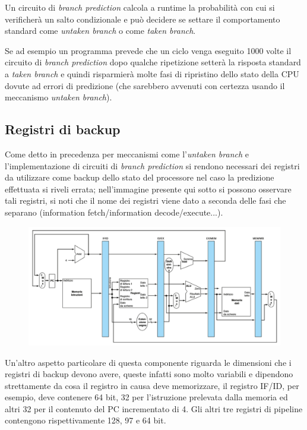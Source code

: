 \documentclass[class=book, crop=false, oneside]{standalone}
\begin{document}
Un circuito di \emph{branch prediction} calcola a runtime la probabilità con cui si verificherà un salto condizionale e può decidere se settare il comportamento standard come \emph{untaken branch} o come \emph{taken branch}.

Se ad esempio un programma prevede che un ciclo venga eseguito 1000 volte il circuito di \emph{branch prediction} dopo qualche ripetizione setterà la risposta standard a \emph{taken branch} e quindi risparmierà molte fasi di ripristino dello stato della CPU dovute ad errori di predizione (che sarebbero avvenuti con certezza usando il meccanismo \emph{untaken branch}).

\subsection{Registri di backup}
Come detto in precedenza per meccanismi come l'\emph{untaken branch} e l'implementazione di circuiti di \emph{branch prediction} si rendono necessari dei registri da utilizzare come backup dello stato del processore nel caso la predizione effettuata si riveli errata; nell'immagine presente qui sotto si possono osservare tali registri, si noti che il nome dei registri viene dato a seconda delle fasi che separano (information fetch/information decode/execute...).
\begin{figure}[H]
	\centering
	\includegraphics[width=\textwidth,keepaspectratio]{registri-di-backup.png}
\end{figure}
Un'altro aspetto particolare di questa componente riguarda le dimensioni che i registri di backup devono avere, queste infatti sono molto variabili e dipendono strettamente da cosa il registro in causa deve memorizzare, il registro IF/ID, per esempio, deve contenere 64 bit, 32 per l’istruzione prelevata dalla memoria ed altri 32 per il contenuto del PC incrementato di 4.
Gli altri tre registri di pipeline contengono rispettivamente 128, 97 e 64 bit.
\end{document}

